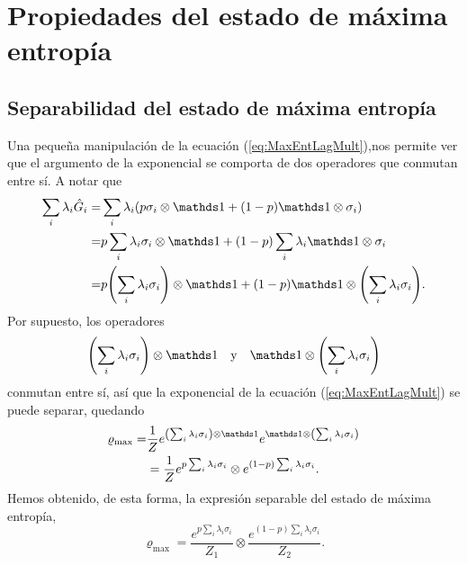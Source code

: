 \section{Propiedades del estado de máxima entropía}

\subsection{Separabilidad del estado de máxima entropía}
Una pequeña manipulación de la ecuación (\ref{eq:MaxEntLagMult}),nos permite ver que el argumento de la exponencial se comporta de dos operadores que conmutan entre sí. A notar que
\begin{align*}
    \sum_{i}\lambda_{i}\hat{G}_{i}=&\sum_{i}\lambda_{i}(p\pauli{i}\otimes\Id+(1-p)\Id\otimes\pauli{i})\\
    =&p\sum_{i}\lambda_{i}\pauli{i}\otimes\Id+(1-p)\sum_{i}\lambda_{i}\Id\otimes\pauli{i}\\
    =&p\qty(\sum_{i}\lambda_{i}\pauli{i})\otimes\Id+(1-p)\Id\otimes\qty(\sum_{i}\lambda_{i}\pauli{i}).
\end{align*}
Por supuesto, los operadores 
\begin{align*}
    \qty(\sum_{i}\lambda_{i}\pauli{i})\otimes\Id && \text{y} && \Id\otimes\qty(\sum_{i}\lambda_{i}\pauli{i})
\end{align*} 
conmutan entre sí, así que la exponencial de la ecuación (\ref{eq:MaxEntLagMult}) se puede separar, quedando
\begin{align*}
    \varrho_{\max}=&\frac{1}{Z}e^{\qty(\sum_{i}\lambda_{i}\pauli{i})\otimes\Id }e^{\Id\otimes\qty(\sum_{i}\lambda_{i}\pauli{i})}\\
    &=\frac{1}{Z}e^{p\sum_{i}\lambda_{i}\pauli{i}}\otimes e^{(1-p)\sum_{i}\lambda_{i}\pauli{i}}.
\end{align*}
Hemos obtenido, de esta forma, la expresión separable del estado de máxima entropía,
\begin{equation}\label{eq:MaxEntSeparable}
    \varrho_{\max}=\frac{e^{p\sum_{i}\lambda_{i}\sigma_{i}}}{Z_{1}} \otimes \frac{e^{(1-p)\sum_{i}\lambda_{i}\sigma_{i}}}{Z_{2}}.
\end{equation}
